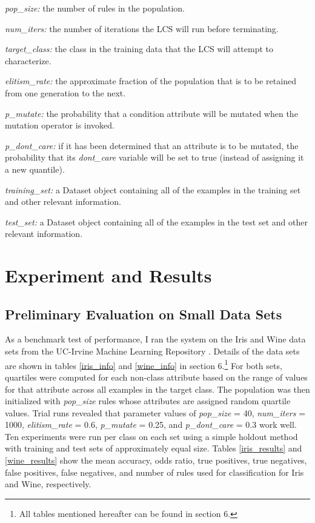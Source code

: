 \documentclass[11pt]{article}
\begin{document}
\begin{description}
\item \textit{pop\_size:} the number of rules in the population.
\item \textit{num\_iters:} the number of iterations the LCS will run before terminating.
\item \textit{target\_class:} the class in the training data that the LCS will attempt to characterize.
\item \textit{elitism\_rate:} the approximate fraction of the population that is to be retained from one generation to the next.
\item \textit{p\_mutate:} the probability that a condition attribute will be mutated when the mutation operator is invoked.
\item \textit{p\_dont\_care:} if it has been determined that an attribute is to be mutated, the probability that its \textit{dont\_care} variable will be set to true (instead of assigning it a new quantile).
\item \textit{training\_set:} a Dataset object containing all of the examples in the training set and other relevant information.
\item \textit{test\_set:} a Dataset object containing all of the examples in the test set and other relevant information.
\end{description}

\section{Experiment and Results}

\subsection{Preliminary Evaluation on Small Data Sets}

As a benchmark test of performance, I ran the system on the Iris and Wine data sets from the UC-Irvine Machine Learning Repository \cite{noauthor_uci_nodate-1,noauthor_uci_nodate}. Details of the data sets are shown in tables \ref{iris_info} and \ref{wine_info} in section 6.\footnote{All tables mentioned hereafter can be found in section 6.} For both sets, quartiles were computed for each non-class attribute based on the range of values for that attribute across all examples in the target class. The population was then initialized with \textit{pop\_size} rules whose attributes are assigned random quartile values. Trial runs revealed that parameter values of \textit{pop\_size} = 40, \textit{num\_iters} = 1000, \textit{elitism\_rate} = 0.6, \textit{p\_mutate} = 0.25, and \textit{p\_dont\_care} = 0.3 work well. Ten experiments were run per class on each set using a simple holdout method with training and test sets of approximately equal size. Tables \ref{iris_results} and \ref{wine_results} show the mean accuracy, odds ratio, true positives, true negatives, false positives, false negatives, and number of rules used for classification for Iris and Wine, respectively. 
\end{document}
